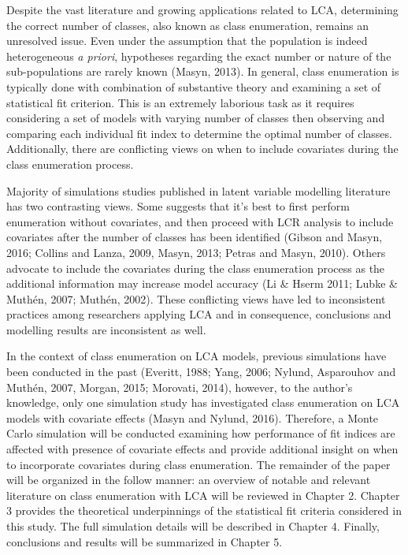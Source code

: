 Despite the vast literature and growing applications related to LCA, determining the correct number of classes, also known as class enumeration, remains an unresolved issue. Even under the assumption that the population is indeed heterogeneous \textit{a priori}, hypotheses regarding the exact number or nature of the sub-populations are rarely known (Masyn, 2013). In general, class enumeration is typically done with combination of substantive theory and examining a set of statistical fit criterion. This is an extremely laborious task as it requires considering a set of models with varying number of classes then observing and comparing each individual fit index to determine the optimal number of classes. Additionally, there are conflicting views on when to include covariates during the class enumeration process. 

Majority of simulations studies published in latent variable modelling literature has two contrasting views. Some suggests that it's best to first perform enumeration without covariates, and then proceed with LCR analysis to include covariates after the number of classes has been identified (Gibson and Masyn, 2016; Collins and Lanza, 2009, Masyn, 2013; Petras and Masyn, 2010). Others advocate to include the covariates during the class enumeration process as the additional information may increase model accuracy (Li & Hserm 2011; Lubke & Muth\'en, 2007; Muth\'en, 2002). These conflicting views have led to inconsistent practices among researchers applying LCA and in consequence, conclusions and modelling results are inconsistent as well. 

In the context of class enumeration on LCA models, previous simulations have been conducted in the past (Everitt, 1988; Yang, 2006; Nylund, Asparouhov and Muth\'en, 2007, Morgan, 2015; Morovati, 2014), however, to the author's knowledge, only one simulation study has investigated class enumeration on LCA models with covariate effects (Masyn and Nylund, 2016). Therefore, a Monte Carlo simulation will be conducted examining how performance of fit indices are affected with presence of covariate effects and provide additional insight on when to incorporate covariates during class enumeration. The remainder of the paper will be organized in the follow manner: an overview of notable and relevant literature on class enumeration with LCA will be reviewed in Chapter 2. Chapter 3 provides the theoretical underpinnings of the statistical fit criteria considered in this study. The full simulation details will be described in Chapter 4. Finally, conclusions and results will be summarized in Chapter 5. 





